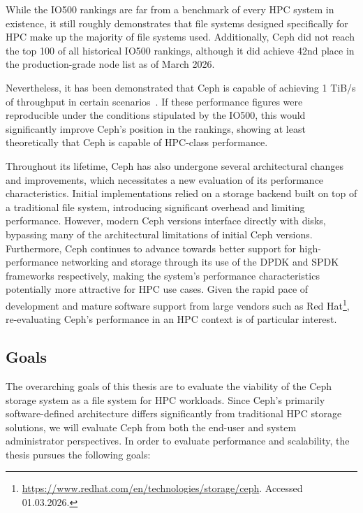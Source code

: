 While the IO500 rankings are far from a benchmark of every \ac{HPC} system in existence, it still roughly demonstrates that file systems designed specifically for \ac{HPC} make up the majority of file systems used. Additionally, Ceph did not reach the top 100 of all historical IO500 rankings, although it did achieve 42nd place in the production-grade node list as of March 2026.

Nevertheless, it has been demonstrated that Ceph is capable of achieving 1 TiB/s of throughput in certain scenarios~\cite{ceph-1tib}. If these performance figures were reproducible under the conditions stipulated by the IO500, this would significantly improve Ceph's position in the rankings, showing at least theoretically that Ceph is capable of \ac{HPC}-class performance.

Throughout its lifetime, Ceph has also undergone several architectural changes and improvements, which necessitates a new evaluation of its performance characteristics. Initial implementations relied on a storage backend built on top of a traditional file system, introducing significant overhead and limiting performance. However, modern Ceph versions interface directly with disks, bypassing many of the architectural limitations of initial Ceph versions. Furthermore, Ceph continues to advance towards better support for high-performance networking and storage through its use of the \ac{DPDK} and \ac{SPDK} frameworks respectively, making the system's performance characteristics potentially more attractive for \ac{HPC} use cases. Given the rapid pace of development and mature software support from large vendors such as Red Hat\footnote{\url{https://www.redhat.com/en/technologies/storage/ceph}. Accessed 01.03.2026.}, re-evaluating Ceph's performance in an \ac{HPC} context is of particular interest.

\subsection{Goals}

The overarching goals of this thesis are to evaluate the viability of the Ceph storage system as a file system for \ac{HPC} workloads. Since Ceph's primarily software-defined architecture differs significantly from traditional \ac{HPC} storage solutions, we will evaluate Ceph from both the end-user and system administrator perspectives. In order to evaluate performance and scalability, the thesis pursues the following goals:

